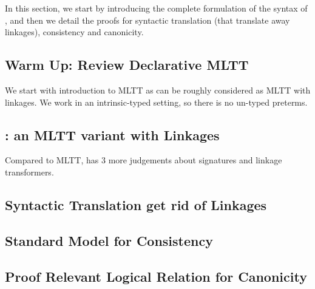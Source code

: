 In this section, we start by introducing the complete formulation of the syntax of \TT, 
and then we detail the proofs for syntactic translation (that translate away linkages), 
consistency and canonicity. 

\subsection{Warm Up: Review Declarative MLTT}
We start with introduction to MLTT as \TT can be roughly considered as MLTT with linkages.
We work in an intrinsic-typed setting, so there is no un-typed preterms.



\subsection{\TT : an MLTT variant with Linkages}
Compared to MLTT, \TT has 3 more judgements about signatures and linkage transformers.








\subsection{Syntactic Translation get rid of Linkages}



\subsection{Standard Model for Consistency}




\subsection{Proof Relevant Logical Relation for Canonicity}

